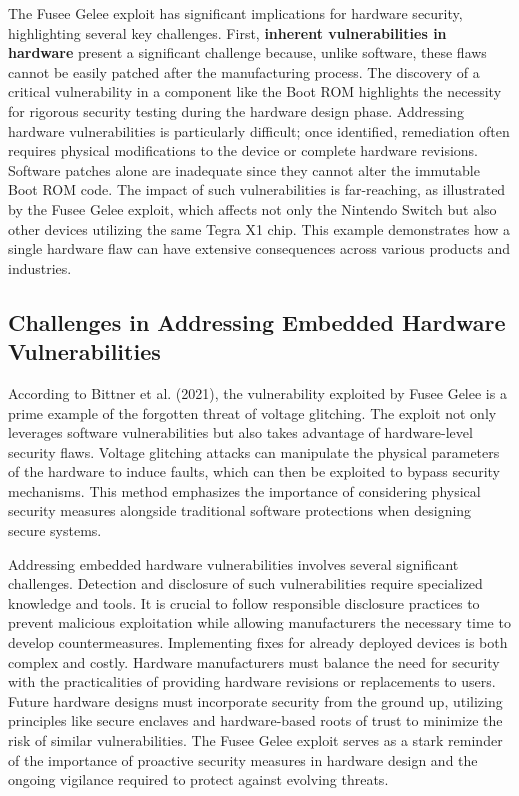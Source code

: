 The Fusee Gelee exploit has significant implications for hardware security, highlighting several key challenges. First, \textbf{inherent vulnerabilities in hardware} present a significant challenge because, unlike software, these flaws cannot be easily patched after the manufacturing process. The discovery of a critical vulnerability in a component like the Boot ROM highlights the necessity for rigorous security testing during the hardware design phase. Addressing hardware vulnerabilities is particularly difficult; once identified, remediation often requires physical modifications to the device or complete hardware revisions. Software patches alone are inadequate since they cannot alter the immutable Boot ROM code. The impact of such vulnerabilities is far-reaching, as illustrated by the Fusee Gelee exploit, which affects not only the Nintendo Switch but also other devices utilizing the same Tegra X1 chip. This example demonstrates how a single hardware flaw can have extensive consequences across various products and industries.

\subsection{Challenges in Addressing Embedded Hardware Vulnerabilities}

According to Bittner et al. (2021), the vulnerability exploited by Fusee Gelee is a prime example of the forgotten threat of voltage glitching. The exploit not only leverages software vulnerabilities but also takes advantage of hardware-level security flaws. Voltage glitching attacks can manipulate the physical parameters of the hardware to induce faults, which can then be exploited to bypass security mechanisms\cite{bittnerForgottenThreatVoltage2021}. This method emphasizes the importance of considering physical security measures alongside traditional software protections when designing secure systems.

Addressing embedded hardware vulnerabilities involves several significant challenges. Detection and disclosure of such vulnerabilities require specialized knowledge and tools. It is crucial to follow responsible disclosure practices to prevent malicious exploitation while allowing manufacturers the necessary time to develop countermeasures. Implementing fixes for already deployed devices is both complex and costly. Hardware manufacturers must balance the need for security with the practicalities of providing hardware revisions or replacements to users. Future hardware designs must incorporate security from the ground up, utilizing principles like secure enclaves and hardware-based roots of trust to minimize the risk of similar vulnerabilities. The Fusee Gelee exploit serves as a stark reminder of the importance of proactive security measures in hardware design and the ongoing vigilance required to protect against evolving threats.